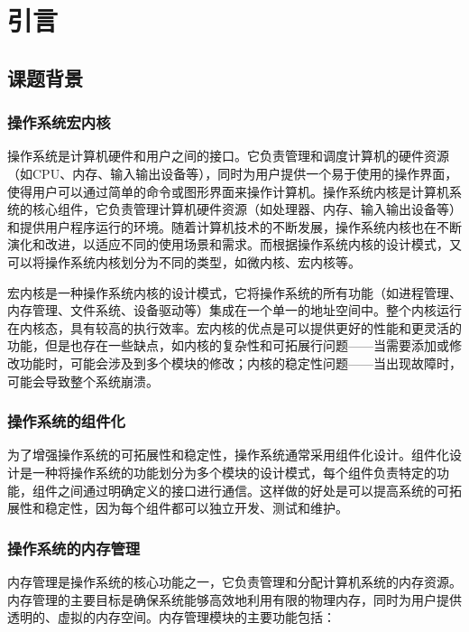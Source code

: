 
\chapter{引言}

\section{课题背景}

\subsection{操作系统宏内核}

操作系统是计算机硬件和用户之间的接口。它负责管理和调度计算机的硬件资源（如CPU、内存、输入输出设备等），同时为用户提供一个易于使用的操作界面，使得用户可以通过简单的命令或图形界面来操作计算机。操作系统内核是计算机系统的核心组件，它负责管理计算机硬件资源（如处理器、内存、输入输出设备等）和提供用户程序运行的环境。随着计算机技术的不断发展，操作系统内核也在不断演化和改进，以适应不同的使用场景和需求。而根据操作系统内核的设计模式，又可以将操作系统内核划分为不同的类型，如微内核、宏内核等。

宏内核是一种操作系统内核的设计模式，它将操作系统的所有功能（如进程管理、内存管理、文件系统、设备驱动等）集成在一个单一的地址空间中。整个内核运行在内核态，具有较高的执行效率。宏内核的优点是可以提供更好的性能和更灵活的功能，但是也存在一些缺点，如内核的复杂性和可拓展行问题——当需要添加或修改功能时，可能会涉及到多个模块的修改；内核的稳定性问题——当出现故障时，可能会导致整个系统崩溃。

\subsection{操作系统的组件化}

为了增强操作系统的可拓展性和稳定性，操作系统通常采用组件化设计。组件化设计是一种将操作系统的功能划分为多个模块的设计模式，每个组件负责特定的功能，组件之间通过明确定义的接口进行通信。这样做的好处是可以提高系统的可拓展性和稳定性，因为每个组件都可以独立开发、测试和维护。

\subsection{操作系统的内存管理}

内存管理是操作系统的核心功能之一，它负责管理和分配计算机系统的内存资源。内存管理的主要目标是确保系统能够高效地利用有限的物理内存，同时为用户提供透明的、虚拟的内存空间。内存管理模块的主要功能包括：


